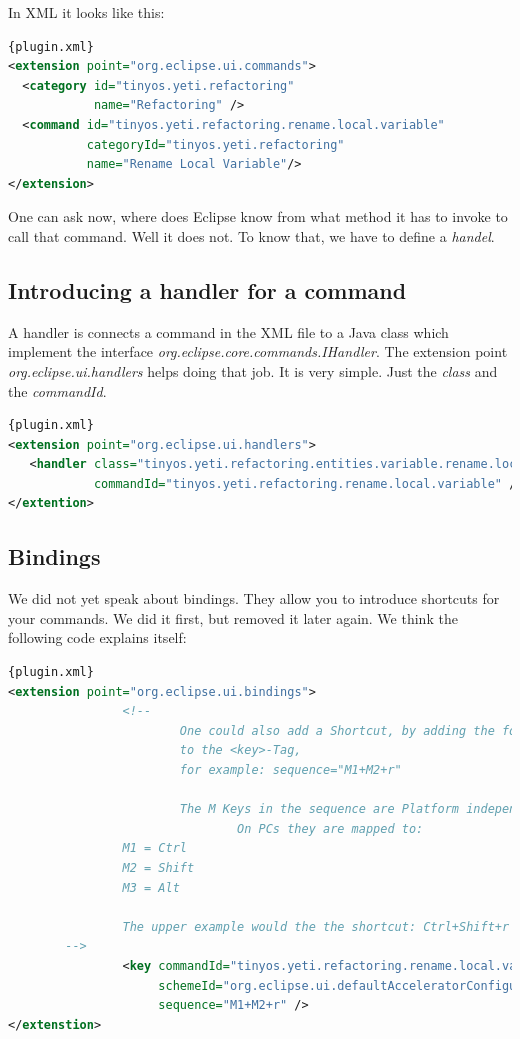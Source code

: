 \documentclass[a4paper,10pt]{report}
\begin{document}
In XML it looks like this:
\begin{lstlisting}[language=XML,caption=Createing a command ({\it plugin.xml})]{plugin.xml}
<extension point="org.eclipse.ui.commands">
  <category id="tinyos.yeti.refactoring"
            name="Refactoring" />
  <command id="tinyos.yeti.refactoring.rename.local.variable"
           categoryId="tinyos.yeti.refactoring"
           name="Rename Local Variable"/>
</extension>
\end{lstlisting}

One can ask now, where does Eclipse know from what method it has to invoke to call that command. Well it does not. To know that, we have to define a {\it handel}.

\subsection{Introducing a handler for a command}
A handler is connects a command in the XML file to a Java class which implement the interface {\it org.eclipse.core.commands.IHandler}. The extension point
{\it org.eclipse.ui.handlers} helps doing that job. It is very simple. Just the {\it class} and the {\it commandId}.
\begin{lstlisting}[language=XML,caption=Connecting a command to a handler ({\it plugin.xml})]{plugin.xml}
<extension point="org.eclipse.ui.handlers">
   <handler class="tinyos.yeti.refactoring.entities.variable.rename.local.RenameLocalVariableActionHandler"
            commandId="tinyos.yeti.refactoring.rename.local.variable" />
</extention>
\end{lstlisting}

\subsection{Bindings}
We did not yet speak about bindings. They allow you to introduce shortcuts for your commands. We did it first, but removed it later again.
We think the following code explains itself:
\begin{lstlisting}[language=XML,caption=Introduce shortcuts ({\it plugin.xml})]{plugin.xml}
<extension point="org.eclipse.ui.bindings">
                <!--
                        One could also add a Shortcut, by adding the following Attribute
                        to the <key>-Tag,
                        for example: sequence="M1+M2+r"

                        The M Keys in the sequence are Platform independent keys.
                                On PCs they are mapped to:
                M1 = Ctrl
                M2 = Shift
                M3 = Alt

                The upper example would the the shortcut: Ctrl+Shift+r
		-->
                <key commandId="tinyos.yeti.refactoring.rename.local.variable"
                     schemeId="org.eclipse.ui.defaultAcceleratorConfiguration"
                     sequence="M1+M2+r" />
</extenstion>
\end{lstlisting}
\end{document}
